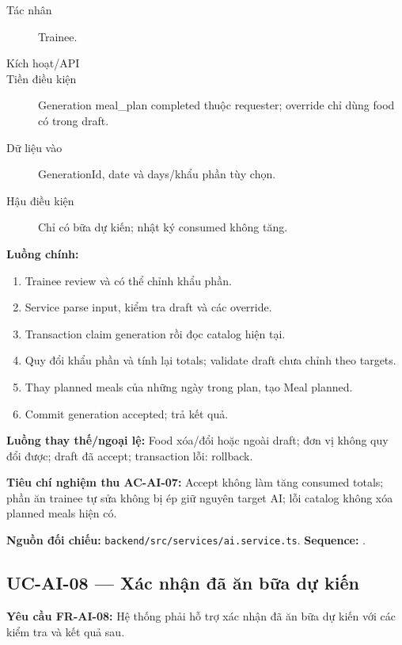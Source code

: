 \documentclass[12pt,a4paper]{article}
\newcommand{\evidence}[1]{{\small\nolinkurl{#1}}}
\begin{document}
\begin{description}
\item[Tác nhân] Trainee.
\item[Kích hoạt/API] 
\item[Tiền điều kiện] Generation meal\_plan completed thuộc requester; override chỉ dùng food có trong draft.
\item[Dữ liệu vào] GenerationId, date và days/khẩu phần tùy chọn.
\item[Hậu điều kiện] Chỉ có bữa dự kiến; nhật ký consumed không tăng.
\end{description}
\textbf{Luồng chính:}
\begin{enumerate}
  \item Trainee review và có thể chỉnh khẩu phần.
  \item Service parse input, kiểm tra draft và các override.
  \item Transaction claim generation rồi đọc catalog hiện tại.
  \item Quy đổi khẩu phần và tính lại totals; validate draft chưa chỉnh theo targets.
  \item Thay planned meals của những ngày trong plan, tạo Meal planned.
  \item Commit generation accepted; trả kết quả.
\end{enumerate}
\textbf{Luồng thay thế/ngoại lệ:} Food xóa/đổi hoặc ngoài draft; đơn vị không quy đổi được; draft đã accept; transaction lỗi: rollback.

\textbf{Tiêu chí nghiệm thu AC-AI-07:} Accept không làm tăng consumed totals; phần ăn trainee tự sửa không bị ép giữ nguyên target AI; lỗi catalog không xóa planned meals hiện có.

\textbf{Nguồn đối chiếu:} \evidence{backend/src/services/ai.service.ts}. \textbf{Sequence:} .

\subsection{UC-AI-08 --- Xác nhận đã ăn bữa dự kiến}
\label{uc-ai-8}
\textbf{Yêu cầu FR-AI-08:} Hệ thống phải hỗ trợ xác nhận đã ăn bữa dự kiến với các kiểm tra và kết quả sau.
\end{document}
